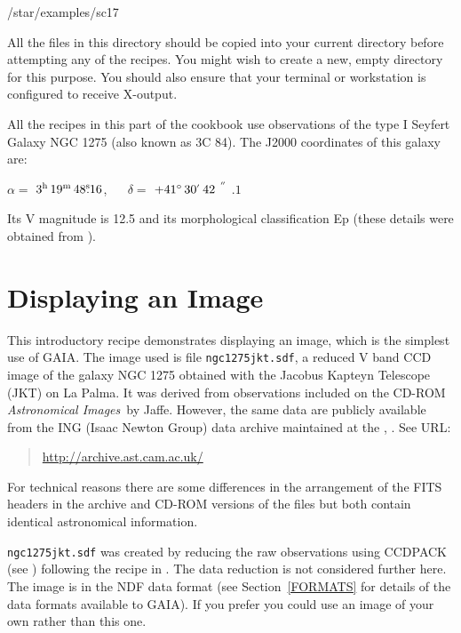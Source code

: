 \documentclass[twoside,11pt]{starlink}
\providecommand{\arcsec} {$\hspace{-0.05em}\raisebox{-0.5ex}
                     {$^{'\hspace{-0.1em}'}$}
                     \hspace{-0.7em}.\hspace{-0.05em}$}
\providecommand{\tsec}   {\mbox{$^{\rm s}\!\!.$}}
\providecommand{\hms}[4] {$#1^{\rm h}\,#2^{\rm m}\,#3\tsec#4$}
\providecommand{\dms}[4] {$#1^{\circ}\,#2\raisebox{-0.5ex}{$^{'}$}\,#3\arcsec#4$}
\begin{document}
\begin{terminalv}
/star/examples/sc17
\end{terminalv}

All the files in this directory should be copied into your current
directory before attempting any of the recipes.  You might wish to create
a new, empty directory for this purpose.  You should also ensure that your
terminal or workstation is configured to receive X-output.

All the recipes in this part of the cookbook use observations of the type
I Seyfert Galaxy NGC 1275 (also known as 3C 84).  The J2000 coordinates
of this galaxy are:

\begin{center}
$\alpha =$ \hms{3}{19}{48}{16}, ~~ $\delta =$ \dms{+41}{30}{42}{1}
\end{center}

Its V magnitude is 12.5 and its morphological classification Ep (these
details were obtained from
).


\newpage
\section{\label{DISP_RECIP}Displaying an Image}

This introductory recipe demonstrates displaying an image, which is the
simplest use of GAIA.  The image used is file \texttt{ngc1275jkt.sdf},
a reduced V band CCD image of the galaxy NGC 1275 obtained with the
Jacobus Kapteyn Telescope (JKT) on La Palma.  It was derived from
observations included on the CD-ROM \textit{Astronomical Images}\, by
Jaffe\cite{JAFFE98}.  However, the same data are publicly available from
the ING (Isaac Newton Group) data archive maintained at the
,
.
See URL:

\begin{quote}
\url{http://archive.ast.cam.ac.uk/}
\end{quote}

For technical reasons there are some differences in the arrangement of the
FITS headers in the archive and CD-ROM versions of the files but both
contain identical astronomical information.

\texttt{ngc1275jkt.sdf} was created by reducing the raw observations using
CCDPACK (see \cite{SUN139}) following the recipe
in \cite{SC5}.  The data reduction is not considered
further here.  The image is in the NDF data format (see Section~\ref{FORMATS}
for details of the data formats available to GAIA).  If you prefer you could
use an image of your own rather than this one.
\end{document}
